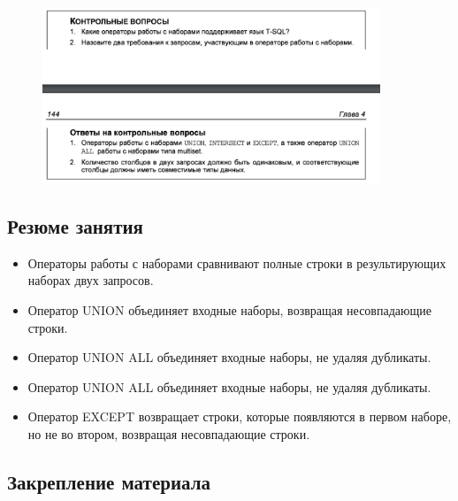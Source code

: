 \begin{figure}[h!]
	\begin{center}
		\includegraphics[width=0.9\textwidth]{img/control13.png}
	\end{center}
	\captionsetup{justification=centering}
\end{figure}



\subsection*{Резюме занятия}
\begin{itemize}
	\item Операторы работы с наборами сравнивают полные строки в результирующих
	наборах двух запросов. 
	\item  Оператор UNION объединяет входные наборы, возвращая несовпадающие строки. 
	\item Оператор UNION ALL объединяет входные наборы, не удаляя дубликаты. 
	\item Оператор UNION ALL объединяет входные наборы, не удаляя дубликаты. 
	\item Оператор EXCEPT возвращает строки, которые появляются в первом наборе, но не
	во втором, возвращая несовпадающие строки. 
\end{itemize}

\subsection*{Закрепление материала}

